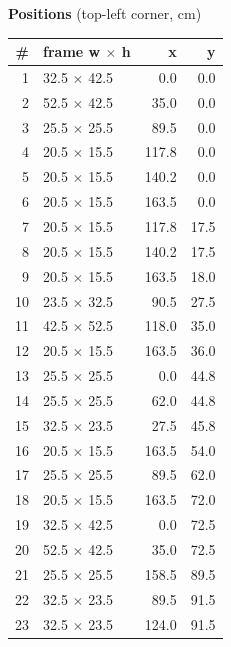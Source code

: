 \documentclass[a4paper,landscape,10pt]{article}
\begin{document}
\begin{minipage}[t]{0.25\textwidth}
\vspace{8pt}
{\bfseries Positions} (top-left corner, cm)\\[2pt]
\tiny
\begin{tabular}{@{}r l r r@{}}
\toprule
\# & frame w $\times$ h & x & y \\
\midrule
1 & 32.5 $\times$ 42.5 & 0.0 & 0.0 \\
2 & 52.5 $\times$ 42.5 & 35.0 & 0.0 \\
3 & 25.5 $\times$ 25.5 & 89.5 & 0.0 \\
4 & 20.5 $\times$ 15.5 & 117.8 & 0.0 \\
5 & 20.5 $\times$ 15.5 & 140.2 & 0.0 \\
6 & 20.5 $\times$ 15.5 & 163.5 & 0.0 \\
7 & 20.5 $\times$ 15.5 & 117.8 & 17.5 \\
8 & 20.5 $\times$ 15.5 & 140.2 & 17.5 \\
9 & 20.5 $\times$ 15.5 & 163.5 & 18.0 \\
10 & 23.5 $\times$ 32.5 & 90.5 & 27.5 \\
11 & 42.5 $\times$ 52.5 & 118.0 & 35.0 \\
12 & 20.5 $\times$ 15.5 & 163.5 & 36.0 \\
13 & 25.5 $\times$ 25.5 & 0.0 & 44.8 \\
14 & 25.5 $\times$ 25.5 & 62.0 & 44.8 \\
15 & 32.5 $\times$ 23.5 & 27.5 & 45.8 \\
16 & 20.5 $\times$ 15.5 & 163.5 & 54.0 \\
17 & 25.5 $\times$ 25.5 & 89.5 & 62.0 \\
18 & 20.5 $\times$ 15.5 & 163.5 & 72.0 \\
19 & 32.5 $\times$ 42.5 & 0.0 & 72.5 \\
20 & 52.5 $\times$ 42.5 & 35.0 & 72.5 \\
21 & 25.5 $\times$ 25.5 & 158.5 & 89.5 \\
22 & 32.5 $\times$ 23.5 & 89.5 & 91.5 \\
23 & 32.5 $\times$ 23.5 & 124.0 & 91.5 \\
\bottomrule
\end{tabular}
\end{minipage}
\clearpage
\end{document}
